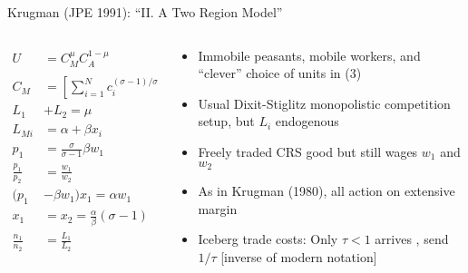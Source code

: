 \documentclass[10pt,notes=hide]{beamer}
\begin{document}
\begin{frame}{Krugman (JPE 1991): ``II. A Two Region Model''}
\begin{columns}
\begin{column}{.5\textwidth}
\begin{align*}
U 
&=
C_M^{\mu}C_A^{1-\mu}
&
\text{(1)}
\\
C_M 
&=
\left[\sum_{i=1}^{N} c_i^{(\sigma-1)/\sigma}\right]^{\sigma/(\sigma-1)}
&
\text{(2)}
\\
L_1 &+ L_2 
=
\mu
&
\text{(3)}
\\
L_{Mi} 
&= 
\alpha + \beta x_i
&
\text{(4)}
\\
p_1 
&=
\frac{\sigma}{\sigma-1} \beta w_1
&
\text{(5)}
\\
\frac{p_1}{p_2}
&=
\frac{w_1}{w_2}  
&
\text{(6)}
\\
(p_1 &- \beta w_1) x_1 
=
\alpha w_1
&
\text{(7)}
\\
x_1 &= x_2 = \frac{\alpha}{\beta} (\sigma-1)
&
\text{(8)}
\\
\frac{n_1}{n_2} &= \frac{L_1}{L_2}
&
\text{(9)}
\end{align*}
\end{column}
\begin{column}{.48\textwidth}
\begin{itemize}
	\item Immobile peasants, mobile workers, and ``clever'' choice of units in (3)
	\item Usual Dixit-Stiglitz monopolistic competition setup, but $L_i$ endogenous
	\item Freely traded CRS good but still wages $w_1$ and $w_2$
	\item As in Krugman (1980), all action on extensive margin
	\item Iceberg trade costs: Only $\tau<1$ arrives , send $1/\tau$ [inverse of modern notation]
\end{itemize}
\end{column}
\end{columns}
\end{frame}
\end{document}
